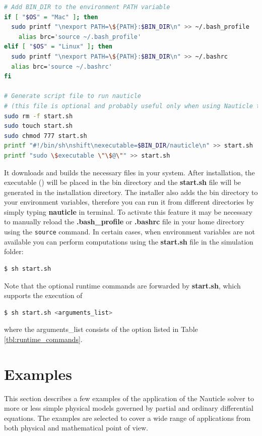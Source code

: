 \documentclass[a4paper,12pt,openany]{book}
\theoremstyle{break}
\begin{document}
\begin{example}{\installer{}}{}
\begin{lstlisting}[language=bash]
# Add BIN_DIR to the environment PATH variable
if [ "$OS" = "Mac" ]; then
  sudo printf "\nexport PATH=\${PATH}:$BIN_DIR\n" >> ~/.bash_profile
    alias brc='source ~/.bash_profile'
elif [ "$OS" = "Linux" ]; then
  sudo printf "\nexport PATH=\${PATH}:$BIN_DIR\n" >> ~/.bashrc
  alias brc='source ~/.bashrc'
fi

# Generate script file to run nauticle
# (this file is optional and probably useful only when using Nauticle through ssh)
sudo rm -f start.sh
sudo touch start.sh
sudo chmod 777 start.sh
printf "#!/bin/sh\nshift\nexecutable=$BIN_DIR/nauticle\n" >> start.sh
printf "sudo \$executable \"\$@\"" >> start.sh

\end{lstlisting}
\end{example}

It downloads and builds the necessary files in your system. After installation, the executable (\execname{}) will be placed in the bin directory and the \textbf{start.sh} file will be generated in the installation directory. The installer also adds the bin directory to your environment variables, therefore you can run it from different directories by simply typing \textbf{nauticle} in terminal. To activate this feature it may be necessary to manually reload the \textbf{.bash\_profile} or \textbf{.bashrc} file in your home directory using the \texttt{source} command.
In certain cases, when environment variables are not available you can perform computations using the \textbf{start.sh} file in the simulation folder:
\begin{lstlisting}[language=bash]
  $ sh start.sh
\end{lstlisting}
Note that the optional runtime commands are forwarded by \textbf{start.sh}, which supports the execution of
\begin{lstlisting}[language=bash]
  $ sh start.sh <arguments_list>
\end{lstlisting}
where the arguments\_list consists of the option listed in Table \ref{tbl:runtime_commands}.










\section{Examples} \label{sec:examples}
This section describes a few examples of the application of the Nauticle solver to more or less simple physical models governed by partial and ordinary differential equations. The examples are selected to cover a wide range of applications from both physical and mathematical point of view.
\end{document}
